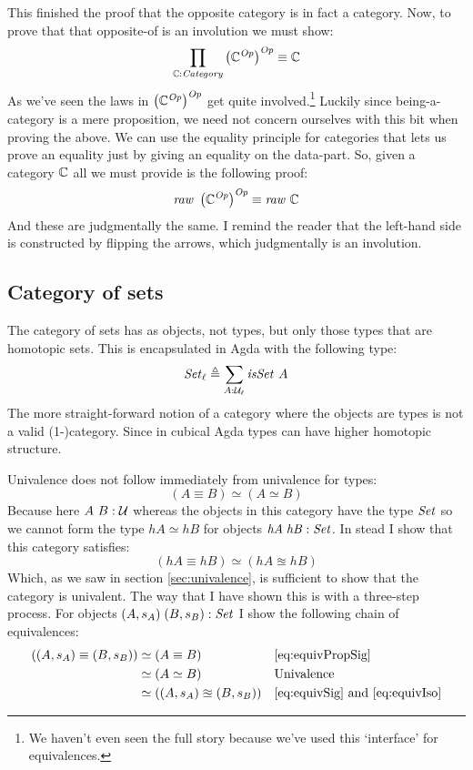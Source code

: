 This finished the proof that the opposite category is in fact a category. Now,
to prove that that opposite-of is an involution we must show:
%
$$
\prod_{\mathbb{C} \mathrel{:} \mathit{Category}} \left(\mathbb{C}^{\mathit{Op}}\right)^{\mathit{Op}} \equiv \mathbb{C}
$$
%
As we've seen the laws in $\left(\mathbb{C}^{\mathit{Op}}\right)^{\mathit{Op}}$ get
quite involved.\footnote{We haven't even seen the full story because we've used
  this `interface' for equivalences.} Luckily since being-a-category is a mere
proposition, we need not concern ourselves with this bit when proving the above.
We can use the equality principle for categories that lets us prove an equality
just by giving an equality on the data-part. So, given a category $\mathbb{C}$ all we
must provide is the following proof:
%
$$
\mathit{raw}\ \left(\bC^{\mathit{Op}}\right)^{\mathit{Op}} \equiv \mathit{raw}\ \bC
$$
%
And these are judgmentally the same. I remind the reader that the left-hand side
is constructed by flipping the arrows, which judgmentally is an involution.

\subsection{Category of sets}
The category of sets has as objects, not types, but only those types that are
homotopic sets. This is encapsulated in Agda with the following type:
%
$$\mathit{Set}_\ell \mathrel{\triangleq} \sum_{A \mathrel{:} \mathcal{U}_\ell} \mathit{isSet}\ A$$
%
The more straight-forward notion of a category where the objects are types is
not a valid (1-)category. Since in cubical Agda types can have higher homotopic
structure.

Univalence does not follow immediately from univalence for types:
%
$$(A \equiv B) \simeq (A \simeq B)$$
%
Because here $A\ B \mathrel{:} \mathcal{U}$ whereas the objects in this category have the type
$\mathit{Set}$ so we cannot form the type $\mathit{hA} \simeq \mathit{hB}$ for objects
$\mathit{hA}\;\mathit{hB} \mathrel{:} \mathit{Set}$. In stead I show that this category
satisfies:
%
$$
(\mathit{hA} \equiv \mathit{hB}) \simeq (\mathit{hA} \approxeq \mathit{hB})
$$
%
Which, as we saw in section \ref{sec:univalence}, is sufficient to show that the
category is univalent. The way that I have shown this is with a three-step
process. For objects $(A, s_A)\; (B, s_B) \mathrel{:} \mathit{Set}$ I show the following chain
of equivalences:
%
\begin{align*}
((A, s_A) \equiv (B, s_B))
 & \simeq (A \equiv B) && \ref{eq:equivPropSig} \\
 & \simeq (A \simeq B) && \text{Univalence} \\
 & \simeq ((A, s_A) \approxeq (B, s_B)) && \text{\ref{eq:equivSig} and \ref{eq:equivIso}}
\end{align*}

